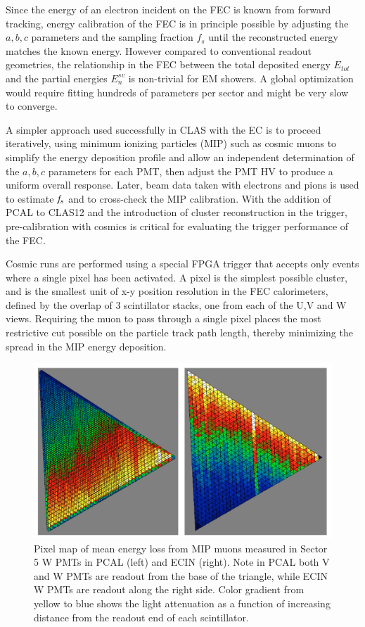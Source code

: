 Since the energy of an electron incident on the FEC is known from forward tracking, energy calibration of the FEC is in principle possible by adjusting the $a,b,c$ parameters and the sampling fraction $f_{s}$ until the reconstructed energy matches the known energy.  However compared to conventional readout geometries, the relationship in the FEC between the total deposited energy $E_{tot}$ and the partial energies $E_{n}^{sv}$ is non-trivial for EM showers.  A global optimization would require fitting hundreds of parameters per sector and might be very slow to converge.

A simpler approach used successfully in CLAS with the EC is to proceed iteratively, using minimum ionizing particles (MIP) such as cosmic muons to simplify the energy deposition profile and allow an independent determination of the $a,b,c$ parameters for each PMT, then adjust the PMT HV to produce a uniform overall response.  Later, beam data taken with electrons and pions is used to estimate $\it{f_s}$ and to cross-check the MIP calibration.  With the addition of PCAL to CLAS12 and the introduction of cluster reconstruction in the trigger, pre-calibration with cosmics is critical for evaluating the trigger performance of the FEC.

Cosmic runs are performed using a special FPGA trigger that accepts only events where a single pixel has been activated. A pixel is the simplest possible cluster, and is the smallest unit of x-y position resolution in the FEC calorimeters, defined by the overlap of 3 scintillator stacks, one from each of the U,V and W views.  Requiring the muon to pass through a single pixel places the most restrictive cut possible on the particle track path length, thereby minimizing the spread in the MIP energy deposition.   
\begin{figure}[hbt]
\centering
\includegraphics[width=1.0\columnwidth,keepaspectratio]{img/S9_1.png}
\caption[]{Pixel map of mean energy loss from MIP muons measured in Sector 5 W PMTs in PCAL (left) and ECIN (right). Note in PCAL both V and W PMTs are readout from the base of the triangle, while ECIN W PMTs are readout along the right side.  Color gradient from yellow to blue shows the light attenuation as a function of increasing distance from the readout end of each scintillator. }
\label{fig:S9_1}
\end{figure}

